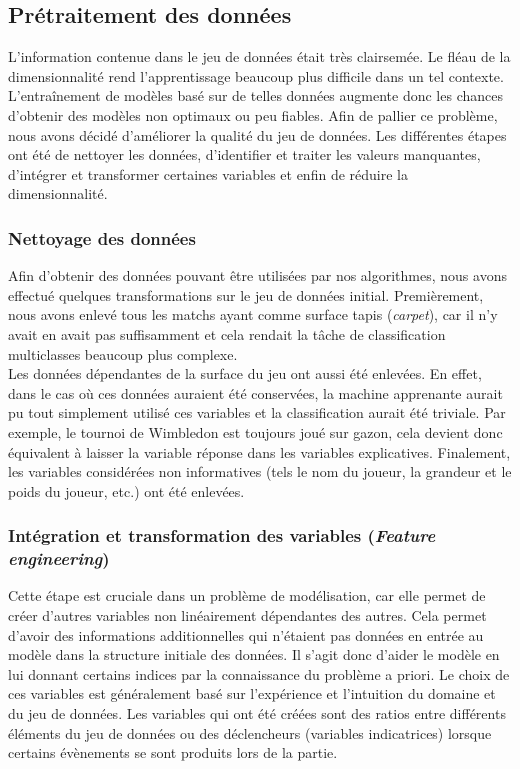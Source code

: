 \subsection{Prétraitement des données}
L'information contenue dans le jeu de données était très clairsemée. Le fléau de la dimensionnalité rend l'apprentissage beaucoup plus difficile dans un tel contexte. L'entraînement de modèles basé sur de telles données augmente donc les chances d'obtenir des modèles non optimaux ou peu fiables. Afin de pallier ce problème, nous avons décidé d'améliorer la qualité du jeu de données. Les différentes étapes ont été de nettoyer les données, d'identifier et traiter les valeurs manquantes, d'intégrer et transformer certaines variables et enfin de réduire la dimensionnalité.

\subsubsection{Nettoyage des données}
Afin d'obtenir des données pouvant être utilisées par nos algorithmes, nous avons effectué quelques transformations sur le jeu de données initial. Premièrement, nous avons enlevé tous les matchs ayant comme surface tapis (\textit{carpet}), car il n'y avait en avait pas suffisamment et cela rendait la tâche de classification multiclasses beaucoup plus complexe. \\

Les données dépendantes de la surface du jeu ont aussi été enlevées. En effet, dans le cas où ces données auraient été conservées, la machine apprenante aurait pu tout simplement utilisé ces variables et la classification aurait été triviale. Par exemple, le tournoi de Wimbledon est toujours joué sur gazon, cela devient donc équivalent à laisser la variable réponse dans les variables explicatives. Finalement, les variables considérées non informatives (tels le nom du joueur, la grandeur et le poids du joueur, etc.) ont été enlevées.

\subsubsection{Intégration et transformation des variables (\textit{Feature engineering})}
Cette étape est cruciale dans un problème de modélisation, car elle permet de créer d'autres variables non linéairement dépendantes des autres. Cela permet d'avoir des informations additionnelles qui n'étaient pas données en entrée au modèle dans la structure initiale des données. Il s'agit donc d'aider le modèle en lui donnant certains indices par la connaissance du problème a priori. Le choix de ces variables est généralement basé sur l'expérience et l'intuition du domaine et du jeu de données. Les variables qui ont été créées sont des ratios entre différents éléments du jeu de données ou des déclencheurs (variables indicatrices) lorsque certains évènements se sont produits lors de la partie.\\

